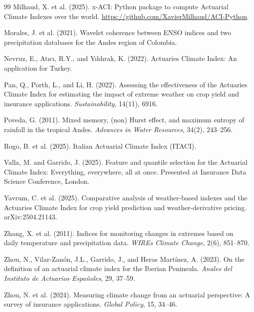 \documentclass[12pt]{article}
\begin{document}
\begin{thebibliography}{99}
Milhaud, X. et al. (2025).
x-ACI: Python package to compute Actuarial Climate Indexes over the world.
\url{https://github.com/XavierMilhaud/ACI-Python}.
 
Morales, J. et al. (2021).
Wavelet coherence between ENSO indices and two precipitation databases for the Andes region of Colombia.
 
Nevruz, E., At{\i}c{\i}, R.Y., and Y{\i}ld{\i}rak, K. (2022).
Actuaries Climate Index: An application for Turkey.
 
Pan, Q., Porth, L., and Li, H. (2022).
Assessing the effectiveness of the Actuaries Climate Index for estimating the impact of extreme weather on crop yield and insurance applications.
\emph{Sustainability}, 14(11), 6916.
 
Poveda, G. (2011).
Mixed memory, (non) Hurst effect, and maximum entropy of rainfall in the tropical Andes.
\emph{Advances in Water Resources}, 34(2), 243--256.
 
Rogo, B. et al. (2025).
Italian Actuarial Climate Index (ITACI).
 
Valla, M. and Garrido, J. (2025).
Feature and quantile selection for the Actuarial Climate Index: Everything, everywhere, all at once.
Presented at Insurance Data Science Conference, London.
 
Yavrum, C. et al. (2025).
Comparative analysis of weather-based indexes and the Actuaries Climate Index for crop yield prediction and weather-derivative pricing.
arXiv:2504.21143.
 
Zhang, X. et al. (2011).
Indices for monitoring changes in extremes based on daily temperature and precipitation data.
\emph{WIREs Climate Change}, 2(6), 851--870.
 
Zhou, N., Vilar-Zan\'on, J.L., Garrido, J., and Heras Mart\'inez, A. (2023).
On the definition of an actuarial climate index for the Iberian Peninsula.
\emph{Anales del Instituto de Actuarios Espa\~noles}, 29, 37--59.
 
Zhou, N. et al. (2024).
Measuring climate change from an actuarial perspective: A survey of insurance applications.
\emph{Global Policy}, 15, 34--46.
 

\end{thebibliography}
\end{document}
